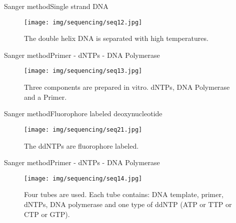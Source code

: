\documentclass[10pt]{beamer}
\newcommand{\1}{
	\setbeamertemplate{background}{
		\texttt{[image: img/1]}
		\tikz[overlay] \fill[fill opacity=0.75,fill=white] (0,0) rectangle (-\paperwidth,\paperheight);
	}
}
\begin{document}
\begin{frame}{Sanger method}{Single strand DNA}
	\begin{figure}[]
		\centering
		\texttt{[image: img/sequencing/seq12.jpg]}
		\label{img:mot2}
		\caption{The double helix DNA is separated with high temperatures.}
	\end{figure}
\end{frame}


\begin{frame}{Sanger method}{Primer - dNTPs - DNA Polymerase}
	\begin{figure}[]
		\centering
		\texttt{[image: img/sequencing/seq13.jpg]}
		\label{img:mot2}
		\caption{Three components are prepared in vitro. dNTPs, DNA Polymerase and a Primer.}
	\end{figure}
\end{frame}

\begin{frame}{Sanger method}{Fluorophore labeled deoxynucleotide}
	\begin{figure}[]
		\centering
		\texttt{[image: img/sequencing/seq21.jpg]}
		\label{img:mot2}
		\caption{The ddNTPs are fluorophore labeled.}
	\end{figure}
\end{frame}

\begin{frame}{Sanger method}{Primer - dNTPs - DNA Polymerase}
	\begin{figure}[]
		\centering
		\texttt{[image: img/sequencing/seq14.jpg]}
		\label{img:mot2}
		\caption{Four tubes are used. Each tube contains: DNA template, primer, dNTPs, DNA polymerase and one type of ddNTP (ATP or TTP or CTP or GTP).}
	\end{figure}
\end{frame}
\end{document}
